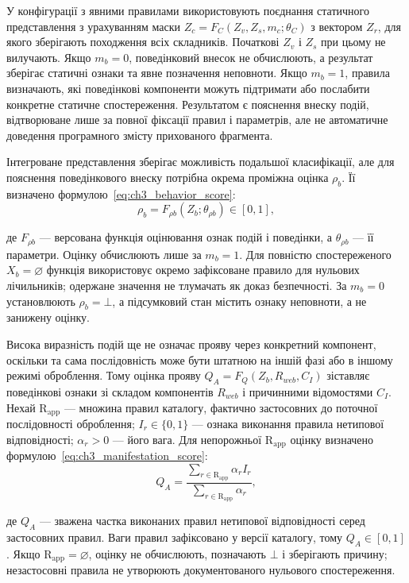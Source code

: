 У конфігурації з явними правилами використовують поєднання статичного представлення з урахуванням маски $Z_c=F_C(Z_v,Z_s,m_c;\theta_C)$ з вектором $Z_r$, для якого зберігають походження всіх складників. Початкові $Z_v$ і $Z_s$ при цьому не вилучають. Якщо $m_b=0$, поведінковий внесок не обчислюють, а результат зберігає статичні ознаки та явне позначення неповноти. Якщо $m_b=1$, правила визначають, які поведінкові компоненти можуть підтримати або послабити конкретне статичне спостереження. Результатом є пояснення внеску подій, відтворюване лише за повної фіксації правил і параметрів, але не автоматичне доведення програмного змісту прихованого фрагмента.

Інтегроване представлення зберігає можливість подальшої класифікації, але для пояснення поведінкового внеску потрібна окрема проміжна оцінка $\rho_b$. Її визначено формулою~\eqref{eq:ch3_behavior_score}:
\begin{equation}
\rho_b=F_{\rho b}(Z_b;\theta_{\rho b})\in[0,1],
\label{eq:ch3_behavior_score}
\end{equation}

де $F_{\rho b}$ --- версована функція оцінювання ознак подій і поведінки, а $\theta_{\rho b}$ --- її параметри. Оцінку обчислюють лише за $m_b=1$. Для повністю спостереженого $X_b=\varnothing$ функція використовує окремо зафіксоване правило для нульових лічильників; одержане значення не тлумачать як доказ безпечності. За $m_b=0$ установлюють $\rho_b=\bot$, а підсумковий стан містить ознаку неповноти, а не занижену оцінку.

Висока виразність подій ще не означає прояву через конкретний компонент, оскільки та сама послідовність може бути штатною на іншій фазі або в іншому режимі оброблення. Тому оцінка прояву $Q_A=F_Q(Z_b,R_{web},C_I)$ зіставляє поведінкові ознаки зі складом компонентів $R_{web}$ і причинними відомостями $C_I$. Нехай $\mathrm R_{\mathrm{app}}$ --- множина правил каталогу, фактично застосовних до поточної послідовності оброблення; $I_r\in\{0,1\}$ --- ознака виконання правила нетипової відповідності; $\alpha_r>0$ --- його вага. Для непорожньої $\mathrm R_{\mathrm{app}}$ оцінку визначено формулою~\eqref{eq:ch3_manifestation_score}:
\begin{equation}
Q_A=
\frac{\sum_{r\in\mathrm R_{\mathrm{app}}}\alpha_r I_r}
{\sum_{r\in\mathrm R_{\mathrm{app}}}\alpha_r},
\label{eq:ch3_manifestation_score}
\end{equation}

де $Q_A$ --- зважена частка виконаних правил нетипової відповідності серед застосовних правил. Ваги правил зафіксовано у версії каталогу, тому $Q_A\in[0,1]$. Якщо $\mathrm R_{\mathrm{app}}=\varnothing$, оцінку не обчислюють, позначають $\bot$ і зберігають причину; незастосовні правила не утворюють документованого нульового спостереження.

